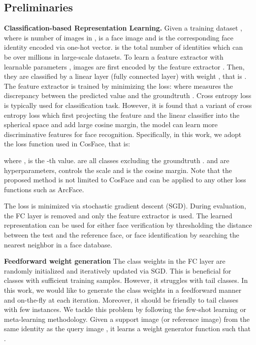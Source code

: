\documentclass[10pt,twocolumn,letterpaper]{article}
\begin{document}
\subsection{Preliminaries}\label{sec:preliminaries}
\textbf{Classification-based Representation Learning.} 
Given a training dataset , where  is number of images in ,  is a face image and  is the corresponding face identity encoded via one-hot vector.  is the total number of identities which can be over millions in large-scale datasets. To learn a feature extractor  with learnable parameters , images are first encoded by the feature extractor . Then, they are classified by a linear layer (fully connected layer) with weight , that is . The feature extractor is trained by minimizing the loss:  where  measures the discrepancy between the predicted value  and the groundtruth . Cross entropy loss is typically used for classification task. However, it is found that a variant of cross entropy loss which first projecting the feature  and the linear classifier  into the spherical space and add large cosine margin, the model can learn more discriminative features for face recognition. Specifically, in this work, we adopt the loss function used in CosFace\cite{wang2018cosface}, that is:



where ,  is the -th value.  are all classes excluding the groundtruth .  and  are hyperparameters,  controls the scale and  is the cosine margin. Note that the proposed method is not limited to CosFace and can be applied to any other loss functions such as ArcFace\cite{deng2019arcface}.

The loss is minimized via stochastic gradient descent (SGD). During evaluation, the FC layer is removed and only the feature extractor is used. The learned representation can be used for either face verification by thresholding the distance between the test and the reference face, or face identification by searching the nearest neighbor in a face database.

\textbf{Feedforward weight generation} The class weights  in the FC layer are randomly initialized and iteratively updated via SGD. This is beneficial for classes with sufficient training samples. However, it struggles with tail classes. In this work, we would like to generate the class weights in a feedforward manner and on-the-fly at each iteration. Moreover, it should be friendly to tail classes with few instances. We tackle this problem by following the few-shot learning or meta-learning methodology. Given a support image (or reference image)  from the same identity as the query image , it learns a weight generator function  such that .
\end{document}
